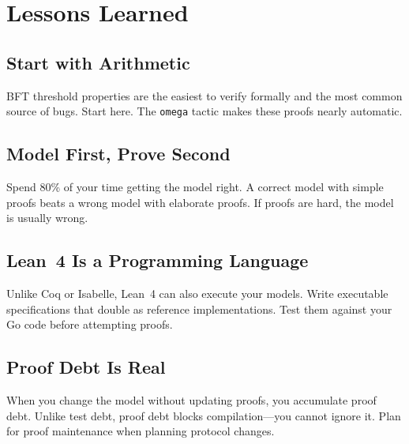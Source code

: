 \section{Lessons Learned}


\subsection{Start with Arithmetic}

BFT threshold properties are the easiest to verify formally and the most common source
of bugs. Start here. The \texttt{omega} tactic makes these proofs nearly automatic.

\subsection{Model First, Prove Second}

Spend 80\% of your time getting the model right. A correct model with simple proofs
beats a wrong model with elaborate proofs. If proofs are hard, the model is usually
wrong.

\subsection{Lean~4 Is a Programming Language}

Unlike Coq or Isabelle, Lean~4 can also execute your models. Write executable
specifications that double as reference implementations. Test them against your Go code
before attempting proofs.

\subsection{Proof Debt Is Real}

When you change the model without updating proofs, you accumulate proof debt. Unlike
test debt, proof debt blocks compilation---you cannot ignore it. Plan for proof
maintenance when planning protocol changes.

